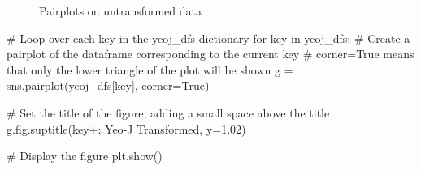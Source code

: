 \documentclass[
  letterpaper,
  DIV=11,
  numbers=noendperiod,
  oneside]{scrartcl}
\newenvironment{Shaded}{\begin{snugshade}}{\end{snugshade}}
\newcommand{\CommentTok}[1]{\textcolor[rgb]{0.37,0.37,0.37}{#1}}
\newcommand{\ControlFlowTok}[1]{\textcolor[rgb]{0.00,0.23,0.31}{#1}}
\newcommand{\FloatTok}[1]{\textcolor[rgb]{0.68,0.00,0.00}{#1}}
\newcommand{\KeywordTok}[1]{\textcolor[rgb]{0.00,0.23,0.31}{#1}}
\newcommand{\NormalTok}[1]{\textcolor[rgb]{0.00,0.23,0.31}{#1}}
\newcommand{\OperatorTok}[1]{\textcolor[rgb]{0.37,0.37,0.37}{#1}}
\newcommand{\StringTok}[1]{\textcolor[rgb]{0.13,0.47,0.30}{#1}}
\newcommand{\VariableTok}[1]{\textcolor[rgb]{0.07,0.07,0.07}{#1}}
\begin{document}
\begin{figure}
\begin{minipage}[t]{0.50\linewidth}
{{}

}

\end{minipage}%

\caption{\label{fig-orgpairs}Pairplots on untransformed data}

\end{figure}

\hfill\break

\begin{Shaded}
\begin{Highlighting}[]
\CommentTok{\# Loop over each key in the \textquotesingle{}yeoj\_dfs\textquotesingle{} dictionary}
\ControlFlowTok{for}\NormalTok{ key }\KeywordTok{in}\NormalTok{ yeoj\_dfs:}
    \CommentTok{\# Create a pairplot of the dataframe corresponding to the current key}
    \CommentTok{\# \textquotesingle{}corner=True\textquotesingle{} means that only the lower triangle of the plot will be shown}
\NormalTok{    g }\OperatorTok{=}\NormalTok{ sns.pairplot(yeoj\_dfs[key], corner}\OperatorTok{=}\VariableTok{True}\NormalTok{)}
    
    \CommentTok{\# Set the title of the figure, adding a small space above the title}
\NormalTok{    g.fig.suptitle(key}\OperatorTok{+}\StringTok{\textquotesingle{}: Yeo{-}J Transformed\textquotesingle{}}\NormalTok{, y}\OperatorTok{=}\FloatTok{1.02}\NormalTok{)}
    
    \CommentTok{\# Display the figure}
\NormalTok{    plt.show()}
\end{Highlighting}
\end{Shaded}
\end{document}
